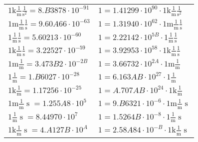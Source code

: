 \begin{center}
\begin{longtable}{l l}
{\color{gray}$1 \bm{\mathrm{ k}}\frac1{\operatorname{m}}\frac1{\operatorname{s}^2}{}{} = 8.B3878\cdot10^{-91} $}   & {\color{gray}$ 1 = 1.41299\cdot10^{90} \cdot 1 \bm{\mathrm{ k}}\frac1{\operatorname{m}}\frac1{\operatorname{s}^2}{}{}$}  \\
{\color{gray}$1 \bm{\mathrm{ m}}\frac1{\operatorname{m}}\frac1{\operatorname{s}}{}{} = 9.60A66\cdot10^{-63} $}   & {\color{gray}$ 1 = 1.31940\cdot10^{62} \cdot 1 \bm{\mathrm{ m}}\frac1{\operatorname{m}}\frac1{\operatorname{s}}{}{}$}  \\
{\color{black}$1 \bm{\mathrm{ }}\frac1{\operatorname{m}}\frac1{\operatorname{s}}{}{} = 5.60213\cdot10^{-60} $}   & {\color{black}$ 1 = 2.22142\cdot10^{5B} \cdot 1 \bm{\mathrm{ }}\frac1{\operatorname{m}}\frac1{\operatorname{s}}{}{}$}  \\
{\color{gray}$1 \bm{\mathrm{ k}}\frac1{\operatorname{m}}\frac1{\operatorname{s}}{}{} = 3.22527\cdot10^{-59} $}   & {\color{gray}$ 1 = 3.92953\cdot10^{58} \cdot 1 \bm{\mathrm{ k}}\frac1{\operatorname{m}}\frac1{\operatorname{s}}{}{}$}  \\
{\color{gray}$1 \bm{\mathrm{ m}}\frac1{\operatorname{m}}{}{}{} = 3.473B2\cdot10^{-2B} $}   & {\color{gray}$ 1 = 3.66732\cdot10^{2A} \cdot 1 \bm{\mathrm{ m}}\frac1{\operatorname{m}}{}{}{}$}  \\
{\color{black}$1 \bm{\mathrm{ }}\frac1{\operatorname{m}}{}{}{} = 1.B6027\cdot10^{-28} $}   & {\color{black}$ 1 = 6.163AB\cdot10^{27} \cdot 1 \bm{\mathrm{ }}\frac1{\operatorname{m}}{}{}{}$}  \\
{\color{gray}$1 \bm{\mathrm{ k}}\frac1{\operatorname{m}}{}{}{} = 1.17256\cdot10^{-25} $}   & {\color{gray}$ 1 = A.707AB\cdot10^{24} \cdot 1 \bm{\mathrm{ k}}\frac1{\operatorname{m}}{}{}{}$}  \\
{\color{gray}$1 \bm{\mathrm{ m}}\frac1{\operatorname{m}}{\operatorname{s}}{}{} = 1.255A8\cdot10^{5} $}   & {\color{gray}$ 1 = 9.B6321\cdot10^{-6} \cdot 1 \bm{\mathrm{ m}}\frac1{\operatorname{m}}{\operatorname{s}}{}{}$}  \\
{\color{black}$1 \bm{\mathrm{ }}\frac1{\operatorname{m}}{\operatorname{s}}{}{} = 8.44970\cdot10^{7} $}   & {\color{black}$ 1 = 1.5264B\cdot10^{-8} \cdot 1 \bm{\mathrm{ }}\frac1{\operatorname{m}}{\operatorname{s}}{}{}$}  \\
{\color{gray}$1 \bm{\mathrm{ k}}\frac1{\operatorname{m}}{\operatorname{s}}{}{} = 4.A127B\cdot10^{A} $}   & {\color{gray}$ 1 = 2.58A84\cdot10^{-B} \cdot 1 \bm{\mathrm{ k}}\frac1{\operatorname{m}}{\operatorname{s}}{}{}$}  \\

\end{longtable}
\end{center}
